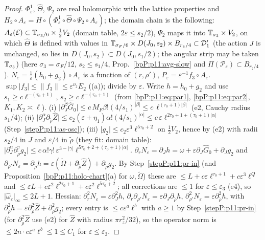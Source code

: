 \begin{proof}
\label{stepP:p11:pr-basic} $\Phi^1_\varepsilon$, $\hat\Theta$, $\Psi_2$ are real holomorphic with the lattice properties and $H_2\circ A_\varepsilon=H\circ(\Phi^1_\varepsilon\circ\hat\Theta\circ\Psi_2\circ A_\varepsilon)$; the domain chain is the following: $A_\varepsilon(\mathcal E)\subset\mathbb{T}_{\sigma_3/6}\times\frac12V_2$ (domain table, $2\varepsilon\le s_2/2$), $\Psi_2$ maps it into $\mathbb{T}_{\sigma_3}\times V_2$, on which $\hat\Theta$ is defined with values in $\mathbb{T}_{\sigma_F/6}\times D(J_0,s_2)\times B_{r_z/4}\subset\mathcal D_1'$ (the action $J$ is unchanged, so lies in $D(J_0,s_2)\subset D(J_0,s_1/2)$; the angular strip may be taken $\mathbb{T}_{\sigma_3}$) (here $\sigma_3=\sigma_F/12$, $s_2\le s_1/4$, Prop.~\ref{bpP:p11:avg-slow} and $\Pi(\mathcal P_\varepsilon)\subset B_{r_z/4}$). $N_\varepsilon=\frac1\varepsilon(h_0+g_2)\circ A_\varepsilon$ is a function of $(r,\rho')$, $P_\varepsilon=\varepsilon^{-1}f_3\circ A_\varepsilon$.
\label{stepP:p11:pr-a} $\sup\lvert f_3\rvert\le\lVert f_3\rVert\le\varepsilon^{\nu_2}E_2$ ((a)); divide by $\varepsilon$.
\label{stepP:p11:pr-in} Write $h=h_0+g_2$ and use $s_1\ge c\ell^{-(\tau_0+1)}$, $s_2\ge c\ell^{-(\tau_0+1)}$ (from \eqref{bpP:p11:eq:par1}, \eqref{bpP:p11:eq:par2}, $K_1,K_2\asymp\ell$). (i) $\lvert\partial_J^\beta\hat G_0\rvert\le c\,M_F\beta!(4/s_1)^{\lvert\beta\rvert}\le c\,\ell^{(\tau_0+1)\lvert\beta\rvert}$ (e2, Cauchy radius $s_1/4$); (ii) $\lvert\partial_J^\alpha\partial_{\tilde\rho}\hat Z\rvert\le c_2(\varepsilon+\eta_1)\alpha!(4/s_1)^{\lvert\alpha\rvert}\le c\,\varepsilon\ell^{2\tau_0+1+(\tau_0+1)\lvert\alpha\rvert}$ (Step~\ref{stepP:p11:as-osc}); (iii) $\lvert g_2\rvert\le c_2\varepsilon^3\ell^{5\tau_0+2}$ on $\frac12V_2$, hence by (e2) with radii $s_2/4$ in $J$ and $\varepsilon/4$ in $\tilde\rho$ (they fit: domain table): $\lvert\partial_J^\alpha\partial_{\tilde\rho}^\gamma g_2\rvert\le c\,\alpha!\gamma!\,\varepsilon^{3-\lvert\gamma\rvert}\ell^{5\tau_0+2+(\tau_0+1)\lvert\alpha\rvert}$.
\label{stepP:p11:pr-b} $\partial_rN_\varepsilon=\partial_Jh=\omega+\varepsilon\partial_J\hat G_0+\partial_Jg_2$ and $\partial_{\rho'}N_\varepsilon=\partial_{\tilde\rho}h=\varepsilon(\tilde\Omega+\partial_{\tilde\rho}\hat Z)+\partial_{\tilde\rho}g_2$. By Step~\ref{stepP:p11:pr-in} (and Proposition~\ref{bpP:p11:holo-chart}(a) for $\omega,\tilde\Omega$) these are $\le L+c\varepsilon\ell^{\tau_0+1}+c\varepsilon^3\ell^{Q}$ and $\le\varepsilon L+c\varepsilon^2\ell^{2\tau_0+1}+c\varepsilon^2\ell^{5\tau_0+2}$; all corrections are $\le1$ for $\varepsilon\le\varepsilon_3$ (e4), so $\lvert\hat\omega_\varepsilon\rvert_\infty\le2L+1$. Hessian: $\partial_r^2N_\varepsilon=\varepsilon\partial_J^2h$, $\partial_r\partial_{\rho'}N_\varepsilon=\varepsilon\partial_J\partial_{\tilde\rho}h$, $\partial_{\rho'}^2N_\varepsilon=\varepsilon\partial_{\tilde\rho}^2h$, with $\partial_{\tilde\rho}^2h=\varepsilon\partial_{\tilde\rho}^2\hat Z+\partial^2_{\tilde\rho}g_2$; every entry is $\le c\varepsilon^{a}\ell^{b}$ with $a\ge1$ by Step~\ref{stepP:p11:pr-in} (for $\partial^2_{\tilde\rho}\hat Z$ use (e2) for $\hat Z$ with radius $\pi r_z^2/32$), so the operator norm is $\le2n\cdot c\varepsilon^a\ell^b\le1\le C_1$ for $\varepsilon\le\varepsilon_3$.

\end{proof}
